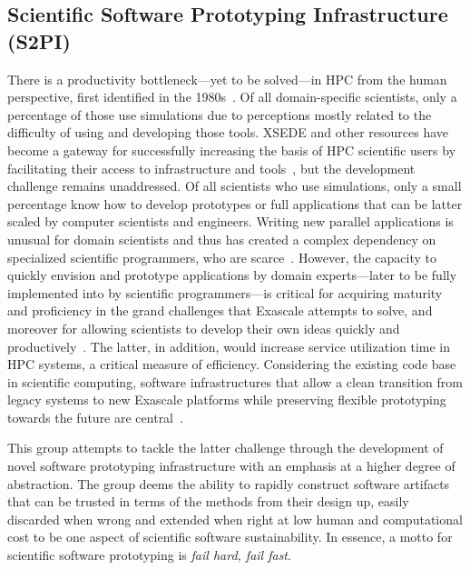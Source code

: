 \subsection{Scientific Software Prototyping Infrastructure (S2PI)}
\label{sec:prototyping}

There is a productivity bottleneck---yet to be solved---in HPC from the human
perspective, first identified in the 1980s~\cite{barstow1982automatic}. Of all
domain-specific scientists, only a percentage of those use simulations due to
perceptions mostly related to the difficulty of using and developing those tools.
XSEDE and other resources have become a gateway for successfully increasing the
basis of HPC scientific users by facilitating their access to infrastructure and
tools~\cite{towns2014xsede}, but the development challenge remains unaddressed.
Of all scientists who use simulations, only a small percentage know how
to develop prototypes or full applications that can be latter scaled by computer
scientists and engineers. Writing new parallel applications is unusual for
domain scientists and thus has created a complex dependency on specialized
scientific programmers, who are scarce~\cite{post2005computational}. However,
the capacity to quickly envision and prototype applications by domain
experts---later to be fully implemented into by scientific programmers---is critical for
acquiring maturity and proficiency in the grand challenges that Exascale
attempts to solve, and moreover for allowing scientists to develop their own
ideas quickly and productively~\cite{vinter2015prototyping}. The latter, in
addition, would increase service utilization time in HPC systems, a critical
measure of efficiency. Considering the existing code base in scientific
computing, software infrastructures that allow a clean transition from legacy
systems to new Exascale platforms while preserving flexible prototyping
towards the future are central~\cite{hwu2015transitioning}.

This group attempts to tackle the latter challenge through the development of
novel software prototyping infrastructure with an emphasis at a higher degree
of abstraction. The group deems the ability to rapidly construct software artifacts that can be
trusted in terms of the methods from their design up, easily discarded when
wrong and extended when right at low human and computational cost to be one
aspect of scientific software sustainability. In essence,
a motto for scientific software prototyping is \textit{fail hard, fail fast}.

